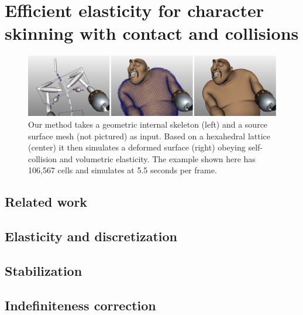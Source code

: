 

\newtheorem{lemma}{Lemma}


\chapter{Efficient elasticity for character skinning with contact and collisions}
\begin{figure}[!ht]
\includegraphics[width=\linewidth]{elasticity/figures/teaser3}
  \caption{Our method takes a geometric internal skeleton (left) and a source
    surface mesh (not pictured) as input. Based on a hexahedral lattice (center)
    it then simulates a deformed surface (right) obeying self-collision and volumetric
    elasticity. The example shown here has 106,567 cells and simulates at 5.5
    seconds per frame.}
\end{figure}
%


\section{Related work}
\label{sec:relatedwork}


\section{Elasticity and discretization}
\label{sec:elasticity}


\section{Stabilization}
\label{sec:stabilization}


\section{Indefiniteness correction}
\label{sec:indefiniteness}


